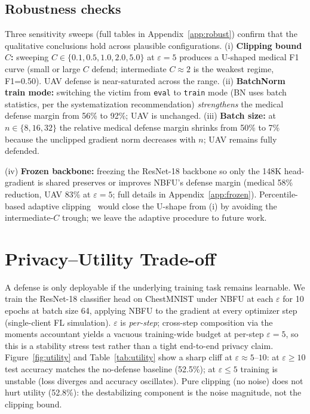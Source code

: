 \documentclass[11pt]{article}
\begin{document}
\subsection{Robustness checks}
\label{sec:robustness}
Three sensitivity sweeps (full tables in Appendix~\ref{app:robust}) confirm that the qualitative conclusions hold across plausible configurations. (i) \textbf{Clipping bound $C$:} sweeping $C \in \{0.1, 0.5, 1.0, 2.0, 5.0\}$ at $\varepsilon{=}5$ produces a U-shaped medical F1 curve (small or large $C$ defend; intermediate $C{\approx}2$ is the weakest regime, F1=0.50). UAV defense is near-saturated across the range. (ii) \textbf{BatchNorm train mode:} switching the victim from \texttt{eval} to \texttt{train} mode (BN uses batch statistics, per the systematization recommendation) \emph{strengthens} the medical defense margin from 56\% to 92\%; UAV is unchanged. (iii) \textbf{Batch size:} at $n \in \{8, 16, 32\}$ the relative medical defense margin shrinks from 50\% to 7\% because the unclipped gradient norm decreases with $n$; UAV remains fully defended.

(iv) \textbf{Frozen backbone:} freezing the ResNet-18 backbone so only the 148K head-gradient is shared preserves or improves NBFU's defense margin (medical 58\% reduction, UAV 83\% at $\varepsilon{=}5$; full details in Appendix~\ref{app:frozen}). Percentile-based adaptive clipping~\citep{andrew2021adaptive} would close the U-shape from (i) by avoiding the intermediate-$C$ trough; we leave the adaptive procedure to future work.


\section{Privacy--Utility Trade-off}
\label{sec:utility}

A defense is only deployable if the underlying training task remains learnable. We train the ResNet-18 classifier head on ChestMNIST under NBFU at each $\varepsilon$ for 10 epochs at batch size 64, applying NBFU to the gradient at every optimizer step (single-client FL simulation). $\varepsilon$ is \emph{per-step}; cross-step composition via the moments accountant yields a vacuous training-wide budget at per-step $\varepsilon{=}5$, so this is a stability stress test rather than a tight end-to-end privacy claim. Figure~\ref{fig:utility} and Table~\ref{tab:utility} show a sharp cliff at $\varepsilon{\approx}5$--$10$: at $\varepsilon \ge 10$ test accuracy matches the no-defense baseline (52.5\%); at $\varepsilon \le 5$ training is unstable (loss diverges and accuracy oscillates). Pure clipping (no noise) does not hurt utility (52.8\%): the destabilizing component is the noise magnitude, not the clipping bound.
\end{document}
